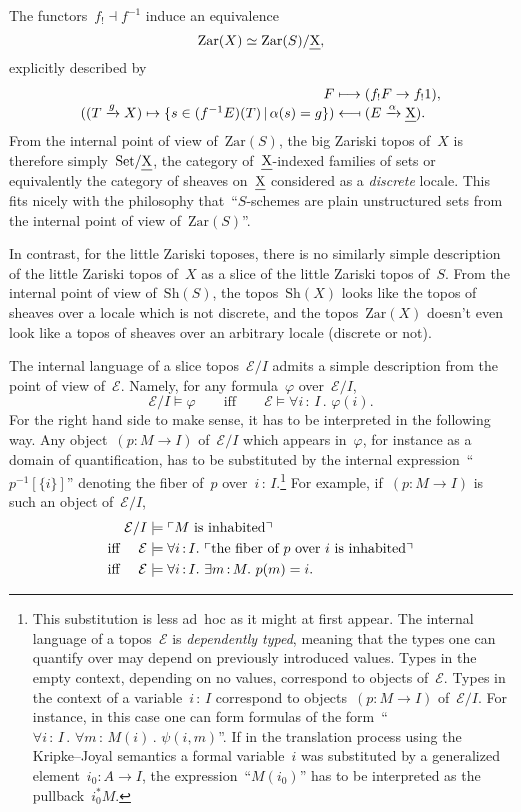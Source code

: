 \documentclass[10pt,reqno,a4paper]{amsbook}
\theoremstyle{definition}
\theoremstyle{plain}
\theoremstyle{remark}
\newcommand{\E}{\mathcal{E}}
\let\oldul\ul
\renewcommand{\ul}[1]{\text{\oldul{$#1$}}}
\newcommand{\Set}{\mathrm{Set}}
\newcommand{\Sh}{\mathrm{Sh}}
\newcommand{\Zar}{\mathrm{Zar}}
\newcommand{\?}{\,{:}\,}
\renewcommand{\_}{\mathpunct{.}\,}
\newcommand{\speak}[1]{\ulcorner\text{\textnormal{#1}}\urcorner}
\newcommand{\xra}{\xrightarrow}
\begin{document}
The functors~$f_! \dashv f^{-1}$ induce an equivalence
\[ \Zar(X) \simeq \Zar(S)/\ul{X}, \]
explicitly described by
\[ \begin{array}{r@{}c@{}l}
  F &{}\longmapsto{}& (f_!F \to f_!1), \\
  ((T \xra{g} X) \mapsto \{ s \in (f^{-1}E)(T) \,|\, \alpha(s) = g \}) &{}\longmapsfrom{}& (E
  \xra{\alpha} \ul{X}).
\end{array} \]
From the internal point of view of~$\Zar(S)$, the big Zariski topos of~$X$ is
therefore simply~$\Set/\ul{X}$, the category of~$\ul{X}$-indexed families of
sets or equivalently the category of sheaves on~$\ul{X}$ considered as a
\emph{discrete} locale. This fits nicely with the philosophy that~``$S$-schemes are
plain unstructured sets from the internal point of view of~$\Zar(S)$''.

In contrast, for the little Zariski toposes, there is no similarly simple
description of the little Zariski topos of~$X$ as a slice of the little Zariski
topos of~$S$. From the internal point of view of~$\Sh(S)$, the topos~$\Sh(X)$
looks like the topos of sheaves over a locale which is not discrete, and the
topos~$\Zar(X)$ doesn't even look like a topos of sheaves over an arbitrary
locale (discrete or not).

The internal language of a slice topos~$\E/I$ admits a
simple description from the point of view of~$\E$. Namely, for
any formula~$\varphi$ over~$\E/I$,
\[ \E/I \models \varphi \qquad\text{iff}\qquad
  \E \models \forall i\?I\_ \varphi(i). \]
For the right hand side to make sense, it has to be interpreted in the
following way. Any object~$(p : M \to I)$ of~$\E/I$ which appears in~$\varphi$,
for instance as a domain of quantification, has to be substituted by the
internal expression~``$p^{-1}[\{i\}]$'' denoting the fiber of~$p$
over~$i\?I$.\footnote{This substitution is less ad~hoc as it might at first
appear. The internal language of a topos~$\E$ is \emph{dependently typed}, meaning
that the types one can quantify over may depend on previously introduced
values. Types in the empty context, depending on no values, correspond to
objects of~$\E$. Types in the context of a variable~$i\?I$ correspond to
objects~$(p : M \to I)$ of~$\E/I$. For instance, in this case one can form
formulas of the form~``$\forall i\?I\_ \forall m\?M(i)\_ \psi(i,m)$''. If in
the translation process using the Kripke--Joyal semantics a formal variable~$i$
was substituted by a generalized element~$i_0 : A \to I$, the
expression~``$M(i_0)$'' has to be interpreted as the pullback~$i_0^* M$.}
For example, if~$(p : M \to I)$ is such an object of~$\E/I$,
\begin{align*}
  &\phantom{\text{iff }} \E/I \models \speak{$M$ is inhabited} \\
  &\text{iff } \phantom{/I}\E \models \forall i\?I\_ \speak{the fiber of $p$ over $i$ is inhabited} \\
  &\text{iff } \phantom{/I}\E \models \forall i\?I\_ \exists m\?M\_ p(m) = i.
\end{align*}
\end{document}
